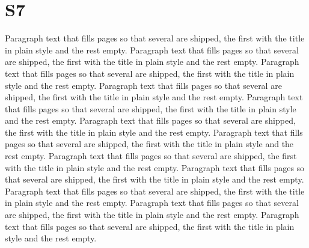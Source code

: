 \documentclass{article}
\begin{document}
\section{S7}
Paragraph text that fills pages so that several are shipped, the first with the title in plain style and the rest empty. Paragraph text that fills pages so that several are shipped, the first with the title in plain style and the rest empty. Paragraph text that fills pages so that several are shipped, the first with the title in plain style and the rest empty. Paragraph text that fills pages so that several are shipped, the first with the title in plain style and the rest empty. Paragraph text that fills pages so that several are shipped, the first with the title in plain style and the rest empty. Paragraph text that fills pages so that several are shipped, the first with the title in plain style and the rest empty. Paragraph text that fills pages so that several are shipped, the first with the title in plain style and the rest empty. Paragraph text that fills pages so that several are shipped, the first with the title in plain style and the rest empty. Paragraph text that fills pages so that several are shipped, the first with the title in plain style and the rest empty. Paragraph text that fills pages so that several are shipped, the first with the title in plain style and the rest empty. Paragraph text that fills pages so that several are shipped, the first with the title in plain style and the rest empty. Paragraph text that fills pages so that several are shipped, the first with the title in plain style and the rest empty. 
\end{document}
